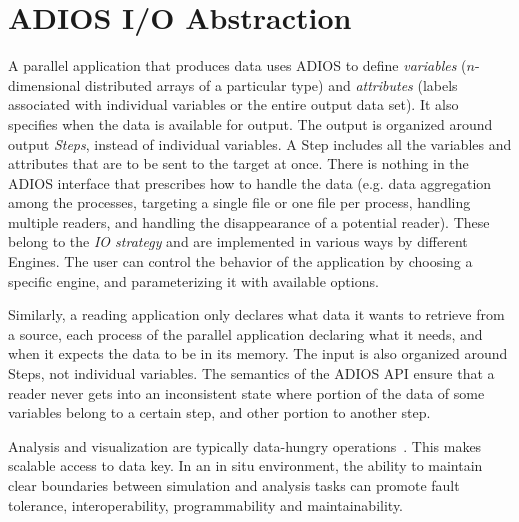 \documentclass[x11names,table,xcdraw,graybox]{svmult}
\begin{document}


%
\section{ADIOS I/O Abstraction}
\label{sec:adios}

A parallel application that produces data uses ADIOS to define \emph{variables} ($n$-dimensional distributed arrays of a particular type) and \emph{attributes} (labels associated with individual variables or the entire output data set).
It also specifies when the data is available for output. The output is organized around output \emph{Steps}, instead of individual variables.
A Step includes all the variables and attributes that are to be sent to the target at once.
There is nothing in the ADIOS interface that prescribes how to handle the data (e.g. data aggregation among the processes, targeting a single file or one file per process, handling multiple readers, and handling the disappearance of a potential reader).
These belong to the \emph{IO strategy} and are implemented in various ways by different Engines.
The user can control the behavior of the application by choosing a specific engine, and parameterizing it with available options.

Similarly, a reading application only declares what data it wants to retrieve from a source, each process of the parallel application declaring what it needs, and when it expects the data to be in its memory.
The input is also organized around Steps, not individual variables. The semantics of the ADIOS API  ensure that a reader never gets into an inconsistent state where portion of the data of some variables belong to a certain step, and other portion to another step.

Analysis and visualization are typically data-hungry operations~\cite{Childs2010}. This makes scalable access to data key. In an in situ environment, the ability to maintain clear boundaries between simulation and analysis tasks can promote fault tolerance, interoperability, programmability and maintainability.
\end{document}
